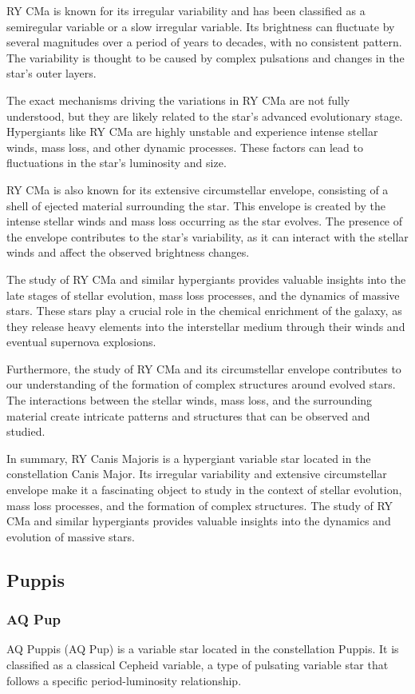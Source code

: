 RY CMa is known for its irregular variability and has been classified as a semiregular variable or a slow irregular variable. Its brightness can fluctuate by several magnitudes over a period of years to decades, with no consistent pattern. The variability is thought to be caused by complex pulsations and changes in the star's outer layers.

The exact mechanisms driving the variations in RY CMa are not fully understood, but they are likely related to the star's advanced evolutionary stage. Hypergiants like RY CMa are highly unstable and experience intense stellar winds, mass loss, and other dynamic processes. These factors can lead to fluctuations in the star's luminosity and size.

RY CMa is also known for its extensive circumstellar envelope, consisting of a shell of ejected material surrounding the star. This envelope is created by the intense stellar winds and mass loss occurring as the star evolves. The presence of the envelope contributes to the star's variability, as it can interact with the stellar winds and affect the observed brightness changes.

The study of RY CMa and similar hypergiants provides valuable insights into the late stages of stellar evolution, mass loss processes, and the dynamics of massive stars. These stars play a crucial role in the chemical enrichment of the galaxy, as they release heavy elements into the interstellar medium through their winds and eventual supernova explosions.

Furthermore, the study of RY CMa and its circumstellar envelope contributes to our understanding of the formation of complex structures around evolved stars. The interactions between the stellar winds, mass loss, and the surrounding material create intricate patterns and structures that can be observed and studied.

In summary, RY Canis Majoris is a hypergiant variable star located in the constellation Canis Major. Its irregular variability and extensive circumstellar envelope make it a fascinating object to study in the context of stellar evolution, mass loss processes, and the formation of complex structures. The study of RY CMa and similar hypergiants provides valuable insights into the dynamics and evolution of massive stars.

\subsection{Puppis}
\subsubsection*{ AQ Pup }
AQ Puppis (AQ Pup) is a variable star located in the constellation Puppis. It is classified as a classical Cepheid variable, a type of pulsating variable star that follows a specific period-luminosity relationship.

